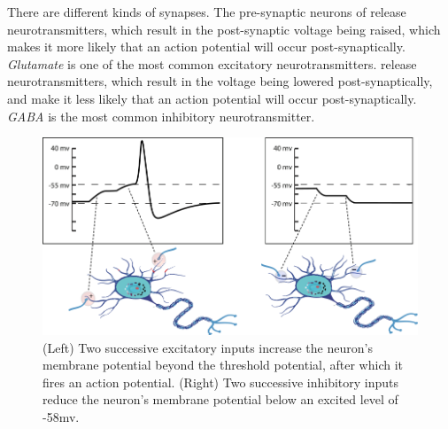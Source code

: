 There are different kinds of synapses. The pre-synaptic neurons of   release neurotransmitters, which result in the  post-synaptic voltage being raised, which makes it more likely that an action potential will occur post-synaptically. \emph{Glutamate} is one of the most common excitatory neurotransmitters.  release neurotransmitters, which result in the voltage being lowered post-synaptically, and make it less likely that an action potential will occur post-synaptically. \emph{GABA} is the most common  inhibitory neurotransmitter.

\begin{figure}[h]
\centering
\includegraphics[scale=1.5]{./images/membranePotential.png}
\caption[Adapted from original work by Pamela Payne.]{(Left) Two successive excitatory inputs increase the neuron's membrane potential beyond the threshold potential, after which  it fires an action potential. (Right) Two successive inhibitory inputs reduce the neuron's membrane potential below an excited level of -58mv. }
\label{membranePotential}
\end{figure}


